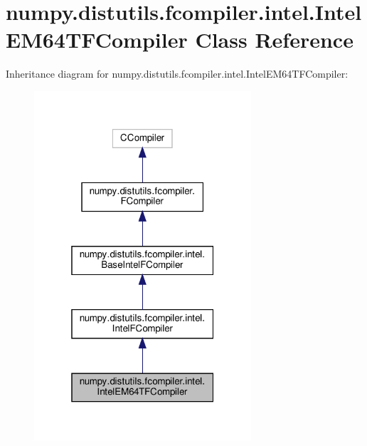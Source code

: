 \hypertarget{classnumpy_1_1distutils_1_1fcompiler_1_1intel_1_1IntelEM64TFCompiler}{}\section{numpy.\+distutils.\+fcompiler.\+intel.\+Intel\+E\+M64\+T\+F\+Compiler Class Reference}
\label{classnumpy_1_1distutils_1_1fcompiler_1_1intel_1_1IntelEM64TFCompiler}


Inheritance diagram for numpy.\+distutils.\+fcompiler.\+intel.\+Intel\+E\+M64\+T\+F\+Compiler\+:
\nopagebreak
\begin{figure}[H]
\begin{center}
\leavevmode
\includegraphics[width=229pt]{classnumpy_1_1distutils_1_1fcompiler_1_1intel_1_1IntelEM64TFCompiler__inherit__graph}
\end{center}
\end{figure}


